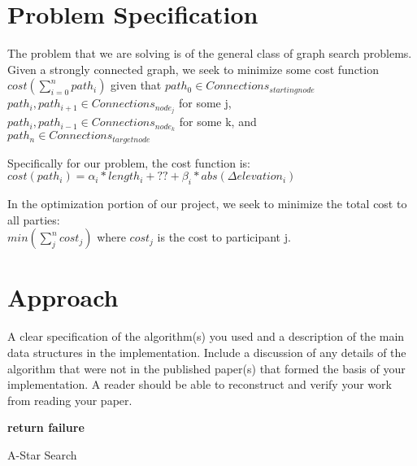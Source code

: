 \documentclass[11pt]{article}
\begin{document}
\section{Problem Specification}

The problem that we are solving is of the general class of graph search problems. Given a strongly connected graph, we seek to minimize some cost function $cost(\sum_{i=0}^n path_i)$ given that  $path_0 \in Connections_{starting node}$ \\$path_i, path_{i+1} \in Connections_{node_j}$ for some j, \\$path_i, path_{i-1} \in Connections_{node_k}$ for some k, and \\$path_n \in Connections_{target node}$

Specifically for our problem, the cost function is:\\
$cost(path_i)= \alpha_i * length_i + ?? + \beta_i * abs(\Delta elevation_i)$

In the optimization portion of our project, we seek to minimize the total cost to all parties:\\
$min(\sum_j^n cost_j)$ where  $cost_j$ is the cost to participant j.

\section{Approach}

A clear specification of the algorithm(s) you used and a description
of the main data structures in the implementation. Include a
discussion of any details of the algorithm that were not in the
published paper(s) that formed the basis of your implementation. A
reader should be able to reconstruct and verify your work from reading
your paper.

\begin{algorithm}
  \begin{algorithmic}
    \Loop 
    \State \textbf{return failure}
    \EndIf
    \EndIf
    \EndIf
    \EndFor
    \EndLoop
    \EndFunction{}
  \end{algorithmic}
  \caption{A-Star Search}
\end{algorithm}
\end{document}

